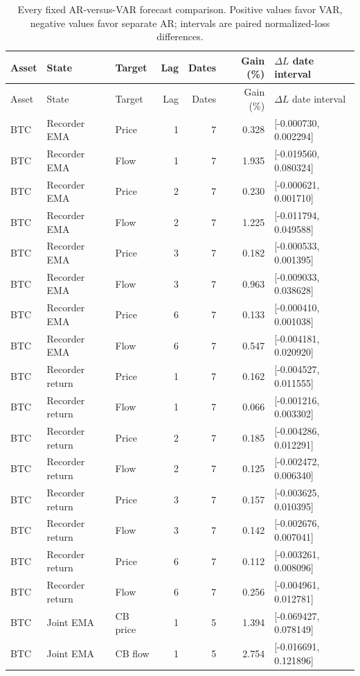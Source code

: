 {\small
\begin{longtable}{lllrrrl}
\caption{Every fixed AR-versus-VAR forecast comparison. Positive values favor VAR, negative values favor separate AR; intervals are paired normalized-loss differences.}\label{tab:forecast_audit_complete}\\
\toprule Asset & State & Target & Lag & Dates & Gain (\%) & $\Delta L$ date interval\\\midrule\endfirsthead
\toprule Asset & State & Target & Lag & Dates & Gain (\%) & $\Delta L$ date interval\\\midrule\endhead
\bottomrule\endfoot
BTC & Recorder EMA & Price & 1 & 7 & 0.328 & [-0.000730, 0.002294]\\
BTC & Recorder EMA & Flow & 1 & 7 & 1.935 & [-0.019560, 0.080324]\\
BTC & Recorder EMA & Price & 2 & 7 & 0.230 & [-0.000621, 0.001710]\\
BTC & Recorder EMA & Flow & 2 & 7 & 1.225 & [-0.011794, 0.049588]\\
BTC & Recorder EMA & Price & 3 & 7 & 0.182 & [-0.000533, 0.001395]\\
BTC & Recorder EMA & Flow & 3 & 7 & 0.963 & [-0.009033, 0.038628]\\
BTC & Recorder EMA & Price & 6 & 7 & 0.133 & [-0.000410, 0.001038]\\
BTC & Recorder EMA & Flow & 6 & 7 & 0.547 & [-0.004181, 0.020920]\\
BTC & Recorder return & Price & 1 & 7 & 0.162 & [-0.004527, 0.011555]\\
BTC & Recorder return & Flow & 1 & 7 & 0.066 & [-0.001216, 0.003302]\\
BTC & Recorder return & Price & 2 & 7 & 0.185 & [-0.004286, 0.012291]\\
BTC & Recorder return & Flow & 2 & 7 & 0.125 & [-0.002472, 0.006340]\\
BTC & Recorder return & Price & 3 & 7 & 0.157 & [-0.003625, 0.010395]\\
BTC & Recorder return & Flow & 3 & 7 & 0.142 & [-0.002676, 0.007041]\\
BTC & Recorder return & Price & 6 & 7 & 0.112 & [-0.003261, 0.008096]\\
BTC & Recorder return & Flow & 6 & 7 & 0.256 & [-0.004961, 0.012781]\\
BTC & Joint EMA & CB price & 1 & 5 & 1.394 & [-0.069427, 0.078149]\\
BTC & Joint EMA & CB flow & 1 & 5 & 2.754 & [-0.016691, 0.121896]\\

\end{longtable}}
